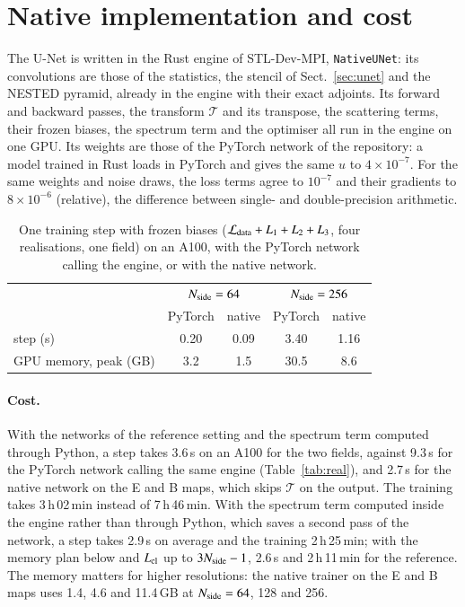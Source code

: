 \documentclass{aa}
\newcommand{\nside}{N_{\rm side}}
\begin{document}
\section{Native implementation and cost}\label{sec:native}

The U-Net is written in the Rust engine of STL-Dev-MPI, \texttt{NativeUNet}: its convolutions are those of the statistics, the stencil of Sect.~\ref{sec:unet} and the NESTED pyramid, already in the engine with their exact adjoints. Its forward and backward passes, the transform $\mathcal{T}$ and its transpose, the scattering terms, their frozen biases, the spectrum term and the optimiser all run in the engine on one GPU. Its weights are those of the PyTorch network of the repository: a model trained in Rust loads in PyTorch and gives the same $u$ to $4\times10^{-7}$. For the same weights and noise draws, the loss terms agree to $10^{-7}$ and their gradients to $8\times10^{-6}$ (relative), the difference between single- and double-precision arithmetic.

\begin{table}
  \caption{One training step with frozen biases ($\mathcal{L}_{\rm data}+L_1+L_2+L_3$, four realisations, one field) on an A100, with the PyTorch network calling the engine, or with the native network.}
  \label{tab:native}
  \centering
  \footnotesize
  \begin{tabular}{lcccc}
    \hline\hline
    & \multicolumn{2}{c}{$\nside=64$} & \multicolumn{2}{c}{$\nside=256$} \\
    & PyTorch & native & PyTorch & native \\
    \hline
    step (s) & 0.20 & 0.09 & 3.40 & 1.16 \\
    GPU memory, peak (GB) & 3.2 & 1.5 & 30.5 & 8.6 \\
    \hline
  \end{tabular}
\end{table}

\paragraph{Cost.} With the networks of the reference setting and the spectrum term computed through Python, a step takes 3.6\,s on an A100 for the two fields, against 9.3\,s for the PyTorch network calling the same engine (Table~\ref{tab:real}), and 2.7\,s for the native network on the E and B maps, which skips $\mathcal{T}$ on the output. The training takes 3\,h\,02\,min instead of 7\,h\,46\,min. With the spectrum term computed inside the engine rather than through Python, which saves a second pass of the network, a step takes 2.9\,s on average and the training 2\,h\,25\,min; with the memory plan below and $L_{\rm cl}$ up to $3\nside-1$, 2.6\,s and 2\,h\,11\,min for the reference. The memory matters for higher resolutions: the native trainer on the E and B maps uses 1.4, 4.6 and 11.4\,GB at $\nside=64$, 128 and 256.
\end{document}
